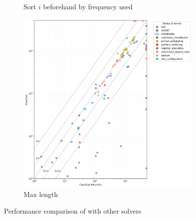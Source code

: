 \begin{figure}[!t]
\begin{subfigure}[t]{0.3\textwidth}
        \caption{Sort $i$ beforehand by frequency used}
        \label{fig:cautical-vs-prelearn}
    \end{subfigure}
    \begin{subfigure}[t]{0.3\textwidth}
        \centering
        \includegraphics[width=\textwidth]{figs/globalmaxlen_heuristic_comparison.jpg}
        \caption{Max length}
        \label{fig:cautical-vs-prelearn}
    \end{subfigure}

    \caption{Performance comparison of \tool with other solvers}
\end{figure}

